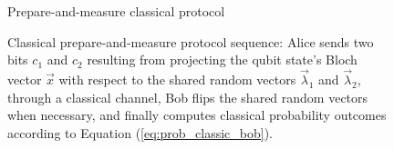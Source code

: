 \begin{figure}[tb]
\begin{center}
\begin{msc}[msc keyword=, instance width=3.6cm]{Prepare-and-measure classical protocol}
\nextlevel[3]
\nextlevel[3]
\nextlevel[1]
\nextlevel[3]
\nextlevel[2]
\end{msc}
\end{center}
\caption{Classical prepare-and-measure protocol sequence: Alice sends two bits $c_1$ and $c_2$ resulting from projecting the qubit state's Bloch vector $\vec{x}$ with respect to the shared random vectors $\vec{\lambda}_1$ and $\vec{\lambda}_2$, through a classical channel, Bob flips the shared random vectors when necessary, and finally computes classical probability outcomes according to Equation (\ref{eq:prob_classic_bob}).}
\label{fig:msc_pm}
\end{figure}

